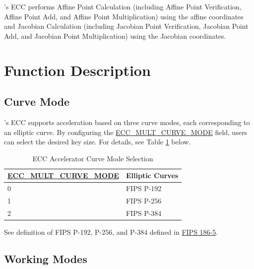\documentclass[main\_\_EN.tex]{subfiles}
\begin{document}
\chipname{}'s ECC performs Affine Point Calculation (including Affine Point Verification, Affine Point Add, and Affine Point Multiplication) using the affine coordinates and Jacobian Calculation (including Jacobian Point Verification, Jacobian Point Add, and Jacobian Point Multiplication) using the Jacobian coordinates.

\section{Function Description}
\label{sec:ecc-mode-config}
\subsection{Curve Mode}

\chipname{}'s ECC supports acceleration based on three curve modes, each corresponding to an elliptic curve. By configuring the \hyperref[fielddesc:ECCMULTCURVEMODE]{ECC\_MULT\_CURVE\_MODE} field, users can select the desired key size. For details, see Table \ref{tab:ecc-curve-mode} below.

\begin{table}[H]
    \centering
    \caption{ECC Accelerator Curve Mode Selection}
    \label{tab:ecc-curve-mode}
    \begin{threeparttable}
    \begin{tabular}{|p{4.2cm}|p{3.6cm}|}
    \hline
        \rowcolor{lightgray}
        \textbf{\hyperref[fielddesc:ECCMULTCURVEMODE]{ECC\_MULT\_CURVE\_MODE}} & \textbf{Elliptic Curves\tnote{*}} \\ \hline
        0 & FIPS P-192  \\\hline
        1 & FIPS P-256  \\\hline
        2 & FIPS P-384  \\\hline
    \end{tabular}
    \begin{tablenotes}
        \item[*] See definition of FIPS P-192, P-256, and P-384 defined in \href{https://nvlpubs.nist.gov/nistpubs/FIPS/NIST.FIPS.186-5.pdf}{FIPS 186-5}.
    \end{tablenotes}
    \end{threeparttable}
\end{table}

\subsection{Working Modes}
\label{sec:ecc-work-mode}
\end{document}
